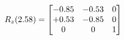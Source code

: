 \documentclass[preview]{standalone}
\begin{document}
\begin{align*}
\special{dvisvgm:raw <g id='unique000'>}R_{z}(2.58) = \begin{bmatrix}-0.85 & -0.53 & 0 \\+0.53 & -0.85 & 0 \\0 & 0 & 1\end{bmatrix}\special{dvisvgm:raw </g>}
\end{align*}
\end{document}

